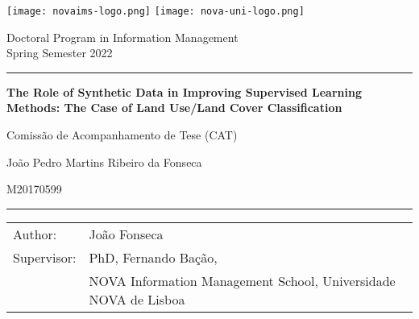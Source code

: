 \thispagestyle{empty}
\begin{titlepage}
	\texttt{[image: novaims-logo.png]}
	\hfill
	\texttt{[image: nova-uni-logo.png]}

    \vspace{.3cm}

	\noindent\begin{small} \sffamily
		\begin{minipage}{0.65\textwidth}
			Doctoral Program in Information Management\\
			Spring Semester 2022\\
		\end{minipage}
	\hrule
	\end{small}

	\vspace{1cm}
    {\LARGE\noindent \textbf{%
            The Role of Synthetic Data in Improving Supervised Learning
            Methods: The Case of Land Use/Land Cover Classification
    } \par}
	\vspace{0.5cm}
    {\Large\noindent Comissão de Acompanhamento de Tese (CAT) \par}
	\vspace{5cm}
	{\LARGE\noindent João Pedro Martins Ribeiro da Fonseca \par}
	{\Large\noindent M20170599 \par}

	\vfill
		
	\hrule
	\vspace{0.3cm}
	
	
	\begin{table}[h!]
		\begin{small} \sffamily
			\begin{tabular}{p{}p{}}
				Author:         & João Fonseca \\
				Supervisor:     & PhD, Fernando Bação, \\
				                & NOVA Information Management School, 
                                  Universidade NOVA de Lisboa \\
			\end{tabular}
		\end{small}
	\end{table}
	
\end{titlepage}
